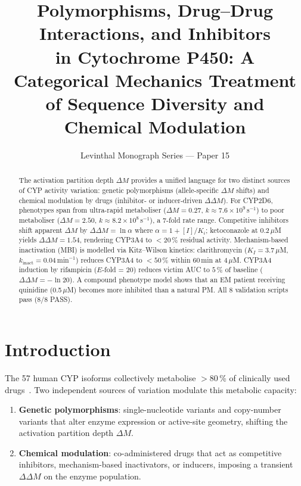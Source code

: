 \documentclass[11pt,twocolumn,a4paper]{article}
\title{\textbf{Polymorphisms, Drug--Drug Interactions, and Inhibitors\\
in Cytochrome P450: A Categorical Mechanics Treatment\\
of Sequence Diversity and Chemical Modulation}}
\author{Levinthal Monograph Series --- Paper 15}
\date{}
\begin{document}
\maketitle

\begin{abstract}
The activation partition depth $\Delta M$ provides a unified language for
two distinct sources of CYP activity variation: genetic polymorphisms
(allele-specific $\Delta M$ shifts) and chemical modulation by drugs
(inhibitor- or inducer-driven $\Delta\Delta M$).  For CYP2D6, phenotypes
span from ultra-rapid metaboliser ($\Delta M = 0.27$, $k \approx 7.6\times10^9$\,s$^{-1}$)
to poor metaboliser ($\Delta M = 2.50$, $k \approx 8.2\times10^8$\,s$^{-1}$), a
7-fold rate range.  Competitive inhibitors shift apparent $\Delta M$ by
$\Delta\Delta M = \ln\alpha$ where $\alpha = 1 + [I]/K_i$; ketoconazole at
0.2\,$\mu$M yields $\Delta\Delta M = 1.54$, rendering CYP3A4 to $< 20$\,\%
residual activity.  Mechanism-based inactivation (MBI) is modelled via
Kitz--Wilson kinetics: clarithromycin ($K_I = 3.7\,\mu$M,
$k_\text{inact} = 0.04$\,min$^{-1}$) reduces CYP3A4 to $<50$\,\% within
60\,min at 4\,$\mu$M.  CYP3A4 induction by rifampicin ($E$-fold = 20)
reduces victim AUC to $5$\,\% of baseline ($\Delta\Delta M = -\ln 20$).
A compound phenotype model shows that an EM patient receiving quinidine
(0.5\,$\mu$M) becomes more inhibited than a natural PM.  All 8 validation
scripts pass (8/8 PASS).
\end{abstract}

\tableofcontents
\newpage

\section{Introduction}

The 57 human CYP isoforms collectively metabolise $>80$\,\% of
clinically used drugs~\cite{Guengerich2019}.  Two independent sources
of variation modulate this metabolic capacity:

\begin{enumerate}
  \item \textbf{Genetic polymorphisms}: single-nucleotide variants and
    copy-number variants that alter enzyme expression or active-site
    geometry, shifting the activation partition depth $\Delta M$.
  \item \textbf{Chemical modulation}: co-administered drugs that act as
    competitive inhibitors, mechanism-based inactivators, or inducers,
    imposing a transient $\Delta\Delta M$ on the enzyme population.
\end{enumerate}
\end{document}
